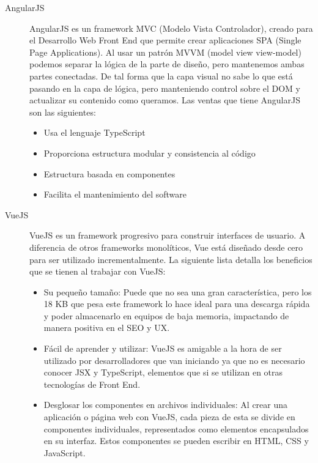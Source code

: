\begin{description}
        \item[AngularJS] AngularJS es un framework MVC (Modelo Vista Controlador), creado para el Desarrollo Web Front End que permite crear aplicaciones SPA (Single Page Applications).
        Al usar un patrón MVVM (model view view-model) podemos separar la lógica de la parte de diseño, pero mantenemos ambas partes conectadas. De tal forma que la capa visual no sabe lo que está pasando en la capa de lógica, pero manteniendo control sobre el DOM y actualizar su contenido como queramos.
        Las ventas que tiene AngularJS son las siguientes:
        \begin{itemize}
            \item Usa el lenguaje TypeScript
            \item Proporciona estructura modular y consistencia al código
            \item Estructura basada en componentes
            \item Facilita el mantenimiento del software
        \end{itemize}

        \item[VueJS]  VueJS es un framework progresivo para construir interfaces de usuario. A diferencia de otros frameworks monolíticos, Vue está diseñado desde cero para ser utilizado incrementalmente.
        La siguiente lista detalla los beneficios que se tienen al trabajar con VueJS:
        
        \begin{itemize}
            \item Su pequeño tamaño: Puede que no sea una gran característica, pero los 18 KB que pesa este framework lo hace ideal para una descarga rápida y poder almacenarlo en equipos de baja memoria, impactando de manera positiva en el SEO y UX.
            \item Fácil de aprender y utilizar: VueJS es amigable a la hora de ser utilizado por desarrolladores que van iniciando ya que no es necesario conocer JSX y TypeScript, elementos que si se utilizan en otras tecnologías de Front End.
            \item Desglosar los componentes en archivos individuales: Al crear una aplicación o página web con VueJS, cada pieza de esta se divide en componentes individuales, representados como elementos encapsulados en su interfaz. Estos componentes se pueden escribir en HTML, CSS y JavaScript.
            
        \end{itemize}
    \end{description}


